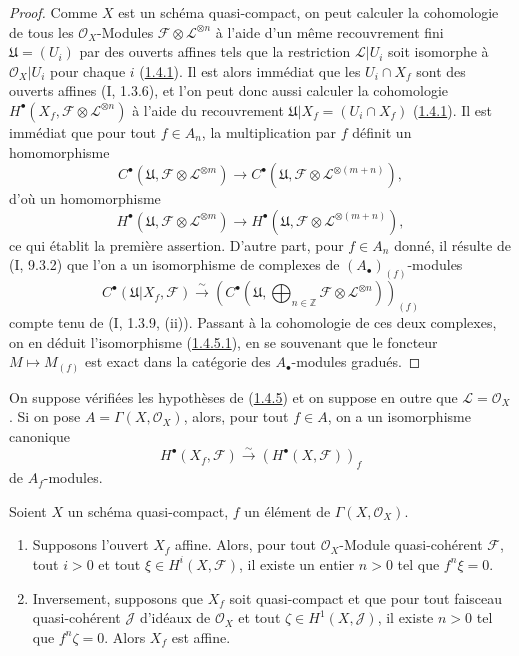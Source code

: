 \begin{proof}
Comme $X$ est un schéma quasi-compact, on peut calculer la cohomologie de
tous les $\mathcal O_X$-Modules
$\mathcal F\otimes\mathcal L^{\otimes n}$ à l'aide d'un même recouvrement
fini $\mathfrak U=(U_i)$ par des ouverts affines tels que la restriction
$\mathcal L\vert U_i$ soit isomorphe à $\mathcal O_X\vert U_i$ pour chaque
$i$ (\hyperref[III.1.4.1-fr]{1.4.1}). Il est alors immédiat que les
$U_i\cap X_f$ sont des ouverts affines (I, 1.3.6), et l'on peut donc aussi
calculer la cohomologie
$H^\bullet(X_f,\mathcal F\otimes\mathcal L^{\otimes n})$ à l'aide du
recouvrement $\mathfrak U\vert X_f=(U_i\cap X_f)$
(\hyperref[III.1.4.1-fr]{1.4.1}). Il est immédiat que pour tout $f\in A_n$,
la multiplication par $f$ définit un homomorphisme
\[
C^\bullet(\mathfrak U,\mathcal F\otimes\mathcal L^{\otimes m})
\longrightarrow
C^\bullet(\mathfrak U,\mathcal F\otimes\mathcal L^{\otimes(m+n)}),
\]
d'où un homomorphisme
\[
H^\bullet(\mathfrak U,\mathcal F\otimes\mathcal L^{\otimes m})
\longrightarrow
H^\bullet(\mathfrak U,\mathcal F\otimes\mathcal L^{\otimes(m+n)}),
\]
ce qui établit la première assertion. D'autre part, pour $f\in A_n$ donné,
il résulte de (I, 9.3.2) que l'on a un isomorphisme de complexes de
$(A_\bullet)_{(f)}$-modules
\[
C^\bullet(\mathfrak U\vert X_f,\mathcal F)
\xrightarrow{\sim}
\left(C^\bullet\left(\mathfrak U,
\bigoplus_{n\in\mathbb Z}\mathcal F\otimes\mathcal L^{\otimes n}
\right)\right)_{(f)}
\]
compte tenu de (I, 1.3.9, (ii)). Passant à la cohomologie de ces deux
complexes, on en déduit l'isomorphisme
(\hyperref[III.1.4.5.1-fr]{1.4.5.1}), en se souvenant que le foncteur
$M\mapsto M_{(f)}$ est exact dans la catégorie des $A_\bullet$-modules
gradués.
\end{proof}

\begin{corollary}[1.4.6]
\label{III.1.4.6-fr}
On suppose vérifiées les hypothèses de
(\hyperref[III.1.4.5-fr]{1.4.5}) et on suppose en outre que
$\mathcal L=\mathcal O_X$. Si on pose $A=\Gamma(X,\mathcal O_X)$, alors,
pour tout $f\in A$, on a un isomorphisme canonique
\[
H^\bullet(X_f,\mathcal F)
\xrightarrow{\sim}(H^\bullet(X,\mathcal F))_f
\]
de $A_f$-modules.
\end{corollary}

\begin{corollary}[1.4.7]
\label{III.1.4.7-fr}
Soient $X$ un schéma quasi-compact, $f$ un élément de
$\Gamma(X,\mathcal O_X)$.
\begin{enumerate}
\item[(i)] Supposons l'ouvert $X_f$ affine. Alors, pour tout
$\mathcal O_X$-Module quasi-cohérent $\mathcal F$, tout $i>0$ et tout
$\xi\in H^i(X,\mathcal F)$, il existe un entier $n>0$ tel que $f^n\xi=0$.
\item[(ii)] Inversement, supposons que $X_f$ soit quasi-compact et que pour
tout faisceau quasi-cohérent $\mathcal J$ d'idéaux de $\mathcal O_X$ et tout
$\zeta\in H^1(X,\mathcal J)$, il existe $n>0$ tel que $f^n\zeta=0$. Alors
$X_f$ est affine.
\end{enumerate}
\end{corollary}

